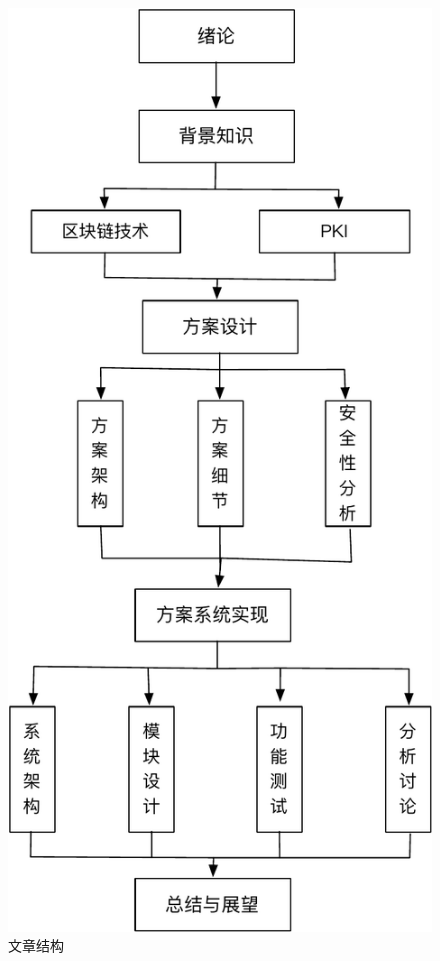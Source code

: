 \begin{figure}[htbp]
 	\centering
 	\includegraphics[scale=0.7]{img/plan}
 	\caption{文章结构}\label{fig:plan}
\end{figure}

